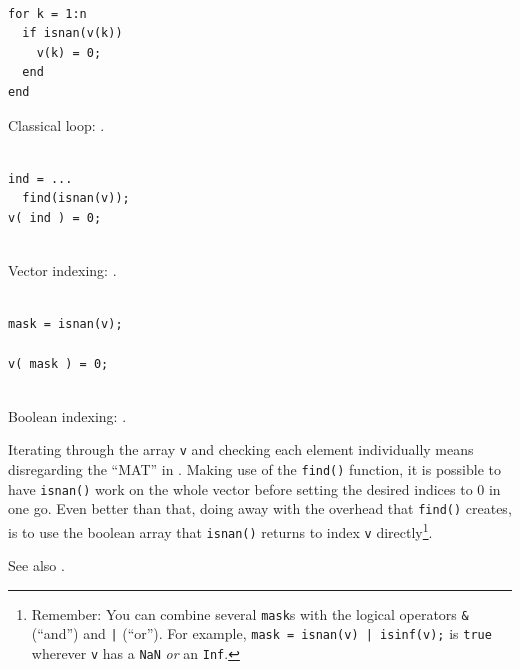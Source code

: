 \hfill
\begin{minipage}[t]{.29\textwidth}
\begin{lstlisting}[framerule=1pt,rulecolor=\color{badred}]
% [...] create v

for k = 1:n
  if isnan(v(k))
    v(k) = 0;
  end
end
\end{lstlisting}
Classical loop: .
\end{minipage}
\hfill
\begin{minipage}[t]{.29\textwidth}
\begin{lstlisting}[framerule=1pt,rulecolor=\color{mediocre}]
% [...] create v

ind = ...
  find(isnan(v));
v( ind ) = 0;


\end{lstlisting}
Vector indexing: .
\end{minipage}
\hfill
\begin{minipage}[t]{.29\textwidth}
\begin{lstlisting}[framerule=1pt,rulecolor=\color{goodgreen}]
% [...] create v

mask = isnan(v);

v( mask ) = 0;


\end{lstlisting}
Boolean indexing: .
\end{minipage}
\hfill

Iterating through the array \lstinline!v! and checking each element
individually means disregarding the ``MAT'' in \matlab{}. Making use of the
\lstinline!find()! function, it is possible to have \lstinline!isnan()! work on
the whole vector before setting the desired indices to 0 in one go. Even better
than that, doing away with the overhead that \lstinline!find()! creates, is to
use the boolean array that \lstinline!isnan()! returns to index \lstinline!v!
directly\footnote{Remember: You can combine several \lstinline!mask!s with the
logical operators \lstinline!&! (``and'') and \lstinline!|! (``or''). For
example, \lstinline!mask = isnan(v) | isinf(v);! is \lstinline!true! wherever
\lstinline!v! has a \lstinline!NaN! \emph{or} an \lstinline!Inf!.}.

See also \cite{Mathworks:2001:MIM}.


